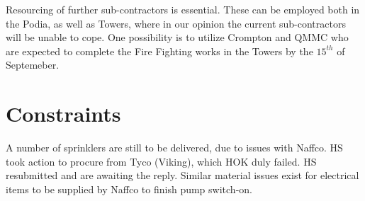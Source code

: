 Resourcing of further sub-contractors is essential. These can be employed both in the Podia, as well as Towers, where in our opinion the current sub-contractors will be unable to cope. One possibility is to utilize Crompton and QMMC who are expected to complete the Fire Fighting works in the Towers by the $15^{th}$ of Septemeber.


\section{Constraints}

A number of sprinklers are still to be delivered, due to issues with Naffco. HS took action to procure from Tyco (Viking), which HOK duly failed. HS resubmitted and are awaiting the reply. Similar material issues exist for electrical items to be supplied by Naffco to finish pump switch-on.


\clearpage



